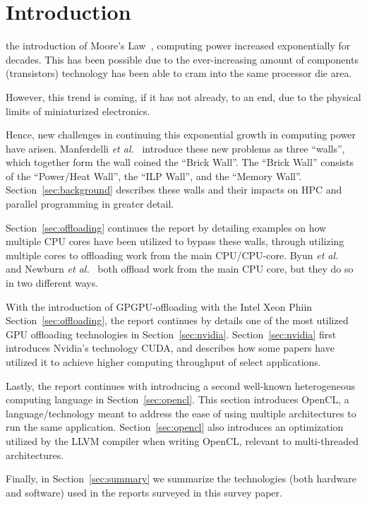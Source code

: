 
\section{Introduction}
\label{sec:intro}

 the introduction of Moore's Law~\cite{Moore:2000:CMC:333067.333074}, computing power increased exponentially for decades.
This has been possible due to the ever-increasing amount of components (transistors) technology has been able to cram into the same processor die area.

However, this trend is coming, if it has not already, to an end, due to the physical limits of miniaturized electronics.

Hence, new challenges in continuing this exponential growth in computing power have arisen.
Manferdelli \textit{et al.}~\cite{4484943} introduce these new problems as three ``walls'', which together form the wall coined the ``Brick Wall''.
The ``Brick Wall'' consists of the ``Power/Heat Wall'', the ``ILP Wall'', and the ``Memory Wall''.
Section~\ref{sec:background} describes these walls and their impacts on HPC and parallel programming in greater detail.

Section~\ref{sec:offloading} continues the report by detailing examples on how multiple CPU cores have been utilized to bypass these walls, through utilizing multiple cores to offloading work from the main CPU/CPU-core.
Byun \textit{et al.}~\cite{Byun:EECS-2012-215} and Newburn \textit{et al.}~\cite{Newburn:2013:OCR:2510648.2511038} both offload work from the main CPU core, but they do so in two different ways.

With the introduction of GPGPU-offloading with the Intel Xeon Phi\texttrademark in Section~\ref{sec:offloading}, the report continues by details one of the most utilized GPU offloading technologies in Section~\ref{sec:nvidia}.
Section~\ref{sec:nvidia} first introduces Nvidia's technology CUDA\texttrademark, and describes how some papers have utilized it to achieve higher computing throughput of select applications.

Lastly, the report continues with introducing a second well-known heterogeneous computing language in Section~\ref{sec:opencl}.
This section introduces OpenCL\texttrademark, a language/technology meant to address the ease of using multiple architectures to run the same application.
Section~\ref{sec:opencl} also introduces an optimization utilized by the LLVM compiler when writing OpenCL, relevant to multi-threaded architectures.

Finally, in Section~\ref{sec:summary} we summarize the technologies (both hardware and software) used in the reports surveyed in this survey paper.
